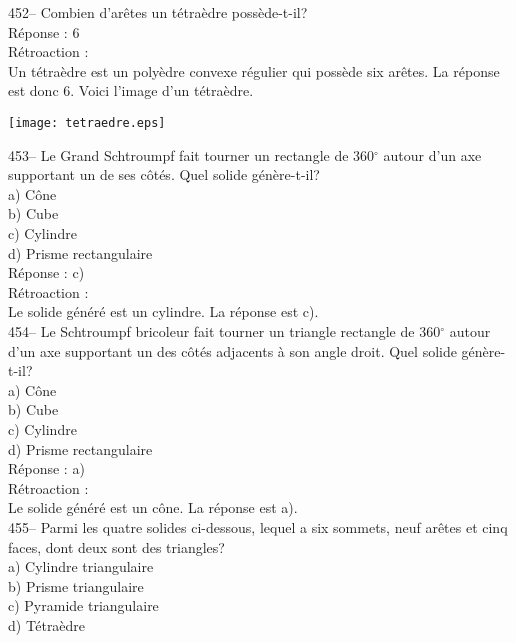 ﻿\documentclass[letterpaper, 12pt]{article}
\begin{document}
452-- Combien d'ar\^etes un t\'etra\`edre poss\`ede-t-il?\\

R\'eponse : 6\\

R\'etroaction : \\
Un t\'etra\`edre est un poly\`edre convexe r\'egulier qui poss\`ede six
ar\^etes.  La r\'eponse est donc 6.  Voici l'image d'un t\'etra\`edre.\\
    \begin{center}
    \texttt{[image: tetraedre.eps]}
    \end{center}


453--  Le Grand Schtroumpf fait tourner un rectangle de 360$^{\circ}$ autour
d'un axe supportant un de ses c\^ot\'es.  Quel solide g\'en\`ere-t-il?\\
a) C\^one\\
b) Cube\\
c) Cylindre\\
d) Prisme rectangulaire\\


R\'eponse : c)\\

R\'etroaction :\\
Le solide g\'en\'er\'e est un cylindre.  La r\'eponse est c).\\


454--  Le Schtroumpf bricoleur fait tourner un triangle rectangle de
360$^{\circ}$ autour d'un axe supportant un des c\^ot\'es adjacents \`a son
angle droit.  Quel solide g\'en\`ere-t-il?\\
a) C\^one\\
b) Cube\\
c) Cylindre\\
d) Prisme rectangulaire\\

R\'eponse : a)\\

R\'etroaction :\\
Le solide g\'en\'er\'e est un c\^one.  La r\'eponse est a).\\

455-- Parmi les quatre solides ci-dessous, lequel a six sommets, neuf
ar\^etes et cinq faces, dont deux sont des triangles?\\
a) Cylindre triangulaire\\
b) Prisme triangulaire\\
c) Pyramide triangulaire\\
d) T\'etra\`edre\\
\end{document}
